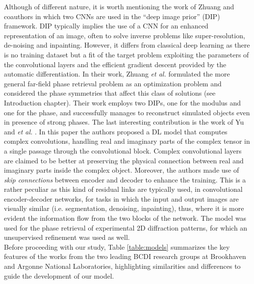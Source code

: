 Although of different nature, it is worth mentioning the work of Zhuang and coauthors \cite{Zhuang2022PracticalPR} in which 
two CNNs are used in the ``deep image prior'' (DIP) framework. DIP \cite{Ulyanov_2020} typically implies the use of a CNN for 
an enhanced representation of an image, often to solve inverse problems like super-resolution, de-noising and inpainting. 
However, it differs from classical deep learning as there is no training dataset but a fit of the target problem exploiting
the parameters of the convolutional layers and the efficient gradient descent provided by the automatic differentiation. 
In their work, Zhuang \textit{et al.} formulated the more general far-field phase retrieval problem as an optimization problem 
and considered the phase symmetries that affect this class of solutions \cite{tayal2020} (see Introduction chapter). Their work employs two 
DIPs, one for the modulus and one for the phase, and successfully manages to reconstruct simulated objects even in presence 
of strong phases. 
The last interesting contribution is the work of Yu and \textit{et al.} \cite{yu_ultrafast_2024}. In this paper the authors
proposed a DL model that computes complex convolutions, handling real and imaginary parts of the complex tensor in a single
passage through the convolutional block. Complex convolutional layers are claimed to be better at preserving the physical connection between real and imaginary parts  
inside the complex object. Moreover, the authors made use of \textit{skip connections} between encoder and decoder to 
enhance the training. This is a rather peculiar as this kind of residual links are typically used, in convolutional 
encoder-decoder networks, for tasks in which the input and output images are visually similar (i.e. segmentation, denoising, inpainting), 
thus, where it is more evident the information flow from the two blocks of the network. 
The model was used for the phase retrieval of experimental 2D diffraction patterns, for which an 
unsupervised refinement was used as well. \\
Before proceeding with our study, Table \ref{table:models} summarizes the key features of the works from the two 
leading BCDI research groups at Brookhaven and Argonne National Laboratories, highlighting similarities and 
differences to guide the development of our model.

